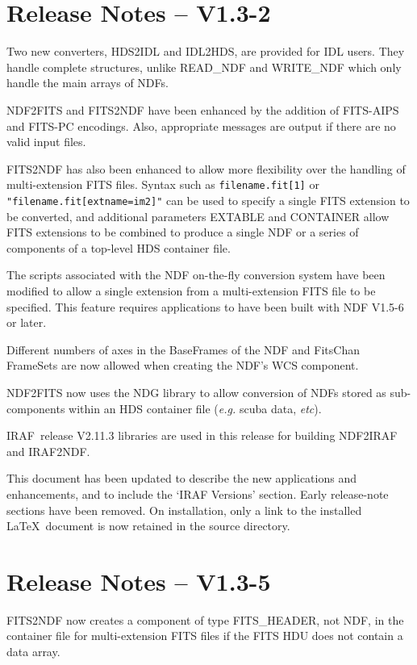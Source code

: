 \documentclass[twoside,11pt]{article}
\newcommand{\htmladdnormallink}[2]{#1}
\newcommand{\htmlref}[2]{#1}
\newcommand{\xref}[3]{#1}
\newcommand{\IRAF}{{\footnotesize IRAF}}
\newcommand{\IRAFURL}{http://star-www.rl.ac.uk/iraf/web/iraf-homepage.html}
\newcommand{\IRAFref}{\htmladdnormallink{\IRAF}{\IRAFURL}}
\begin{document}
\section{Release Notes -- V1.3-2}
Two new converters, 
\htmlref{HDS2IDL}{HDS2IDL}
and
\htmlref{IDL2HDS}{IDL2HDS},
are provided for IDL users. They handle complete structures, unlike 
\htmlref{READ\_NDF}{READ_NDF}
and
\htmlref{WRITE\_NDF}{WRITE_NDF}
which only handle the main arrays of NDFs. 

\htmlref{NDF2FITS}{NDF2FITS}
and
\htmlref{FITS2NDF}{FITS2NDF}
have been enhanced by the addition of FITS-AIPS and FITS-PC encodings. Also,
appropriate messages are  output if there are no valid input files.

\htmlref{FITS2NDF}{FITS2NDF}
has also been enhanced to allow more flexibility over the handling of
multi-extension FITS files. Syntax such as \texttt{filename.fit[1]} or
\texttt{"filename.fit[extname=im2]"} can be used to specify a single FITS
extension to be converted, and additional parameters EXTABLE and CONTAINER
allow FITS extensions to be combined to produce a single NDF or a series of
components of a top-level HDS container file.

The scripts associated with the NDF on-the-fly conversion system have been
modified to allow a single extension from a multi-extension FITS file to be
specified.  This feature requires applications to have been built with NDF 
V1.5-6 or later.

Different numbers of axes in the  BaseFrames of the NDF and FitsChan FrameSets
are now allowed when creating the NDF's WCS component.

\htmlref{NDF2FITS}{NDF2FITS} now uses the 
\xref{NDG}{sun2}{}
library to allow conversion of NDFs stored as sub-components within an 
HDS container file (\textit{e.g.} scuba data, \textit{etc}).

\IRAFref\ release V2.11.3 libraries are used in this release for building
\htmlref{NDF2IRAF}{NDF2IRAF}
and
\htmlref{IRAF2NDF}{IRAF2NDF}.

This document has been updated to describe the new applications and
enhancements, and to include the
\htmlref{`{\small IRAF} Versions' section}{iraf_versions}.
Early release-note sections have been removed.
On installation, only a link to the installed \LaTeX\ document is now retained
in the source directory.

\section{Release Notes -- V1.3-5}
\htmlref{FITS2NDF}{FITS2NDF}
now creates a component of type FITS\_HEADER, not NDF, in the container
file for multi-extension FITS files if the FITS HDU does not contain a data
array.
\end{document}
